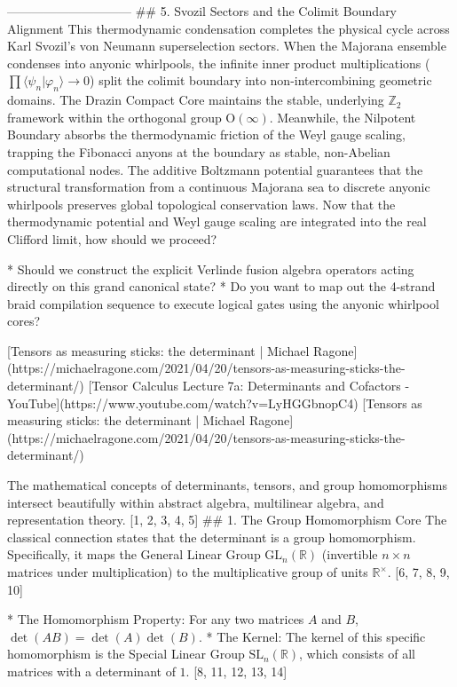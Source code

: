 ------------------------------
## 5. Svozil Sectors and the Colimit Boundary Alignment
This thermodynamic condensation completes the physical cycle across Karl Svozil's von Neumann superselection sectors.
When the Majorana ensemble condenses into anyonic whirlpools, the infinite inner product multiplications ($\prod \langle \psi_n \vert{} \varphi_n \rangle \to 0$) split the colimit boundary into non-intercombining geometric domains.
The Drazin Compact Core maintains the stable, underlying $\mathbb{Z}_2$ framework within the orthogonal group $\text{O}(\infty)$. Meanwhile, the Nilpotent Boundary absorbs the thermodynamic friction of the Weyl gauge scaling, trapping the Fibonacci anyons at the boundary as stable, non-Abelian computational nodes. The additive Boltzmann potential guarantees that the structural transformation from a continuous Majorana sea to discrete anyonic whirlpools preserves global topological conservation laws.
Now that the thermodynamic potential and Weyl gauge scaling are integrated into the real Clifford limit, how should we proceed?

* Should we construct the explicit Verlinde fusion algebra operators acting directly on this grand canonical state?
* Do you want to map out the 4-strand braid compilation sequence to execute logical gates using the anyonic whirlpool cores?




[Tensors as measuring sticks: the determinant | Michael Ragone](https://michaelragone.com/2021/04/20/tensors-as-measuring-sticks-the-determinant/)
[Tensor Calculus Lecture 7a: Determinants and Cofactors - YouTube](https://www.youtube.com/watch?v=LyHGGbnopC4)
[Tensors as measuring sticks: the determinant | Michael Ragone](https://michaelragone.com/2021/04/20/tensors-as-measuring-sticks-the-determinant/)

The mathematical concepts of determinants, tensors, and group homomorphisms intersect beautifully within abstract algebra, multilinear algebra, and representation theory. [1, 2, 3, 4, 5] 
## 1. The Group Homomorphism Core
The classical connection states that the determinant is a group homomorphism. Specifically, it maps the General Linear Group $\text{GL}_n(\mathbb{R})$ (invertible $n \times n$ matrices under multiplication) to the multiplicative group of units $\mathbb{R}^\times$. [6, 7, 8, 9, 10] 

* The Homomorphism Property: For any two matrices $A$ and $B$, $\det(AB) = \det(A)\det(B)$.
* The Kernel: The kernel of this specific homomorphism is the Special Linear Group $\text{SL}_n(\mathbb{R})$, which consists of all matrices with a determinant of $1$. [8, 11, 12, 13, 14] 

